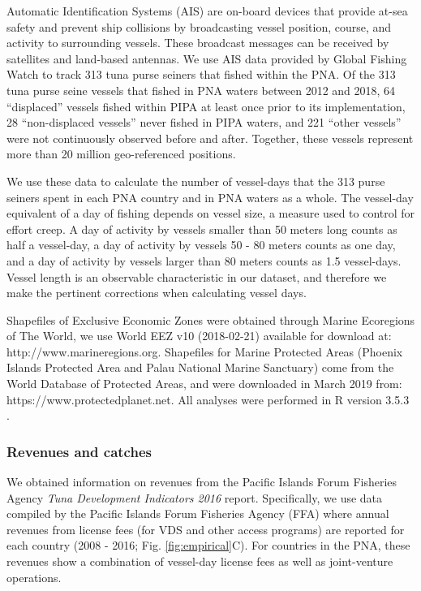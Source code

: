 \documentclass[12pt]{article}
\begin{document}
Automatic Identification Systems (AIS) are on-board devices that provide at-sea safety and prevent ship collisions by broadcasting vessel position, course, and activity to surrounding vessels. These broadcast messages can be received by satellites and land-based antennas. We use AIS data provided by Global Fishing Watch \cite{kroodsma_2018} to track 313 tuna purse seiners that fished within the PNA. Of the 313 tuna purse seine vessels that fished in PNA waters between 2012 and 2018, 64 ``displaced'' vessels fished within PIPA at least once prior to its implementation, 28 ``non-displaced vessels'' never fished in PIPA waters, and  221 ``other vessels'' were not continuously observed before and after. Together, these vessels represent more than 20 million geo-referenced positions.

We use these data to calculate the number of vessel-days that the 313 purse seiners spent in each PNA country and in PNA waters as a whole. The vessel-day equivalent of a day of fishing depends on vessel size, a measure used to control for effort creep. A day of activity by vessels smaller than 50 meters long counts as half a vessel-day, a day of activity by vessels 50 - 80 meters counts as one day, and a day of activity by vessels larger than 80 meters counts as 1.5 vessel-days. Vessel length is an observable characteristic in our dataset, and therefore we make the pertinent corrections when calculating vessel days.

Shapefiles of Exclusive Economic Zones were obtained through Marine Ecoregions of The World, we use World EEZ v10 (2018-02-21) available for download at: http://www.marineregions.org. Shapefiles for Marine Protected Areas (Phoenix Islands Protected Area and Palau National Marine Sanctuary) come from the World Database of Protected Areas, and were downloaded in March 2019 from: https://www.protectedplanet.net. All analyses were performed in R version 3.5.3 \cite{rcore_2018}.

\subsubsection{Revenues and catches}

We obtained information on revenues from the Pacific Islands Forum Fisheries Agency \emph{Tuna Development Indicators 2016} report.  Specifically, we use data compiled by the Pacific Islands Forum Fisheries Agency (FFA\cite{ffa_2017}) where annual revenues from license fees (for VDS and other access programs) are reported for each country (2008 - 2016; Fig. \ref{fig:empirical}C). For countries in the PNA, these revenues show a combination of vessel-day license fees as well as joint-venture operations.
\end{document}
